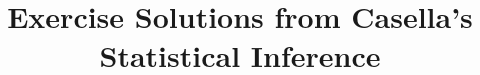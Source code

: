 \documentclass{book}
\begin{document}
\title{Exercise Solutions from Casella's Statistical Inference}

\tableofcontents



% 
% 
% 
% 
% 
% 
% 
% 
% 
% 
% 
% 
% 
% 
\end{document}
